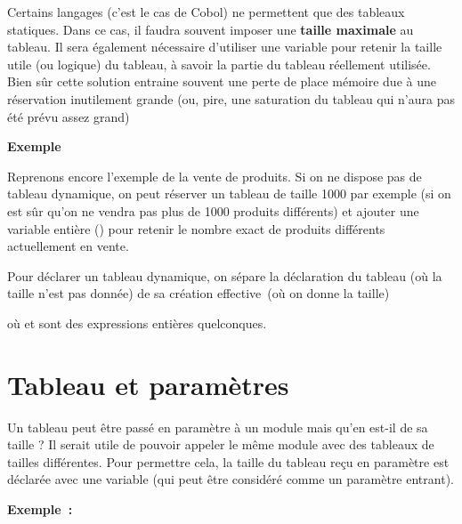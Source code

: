 	Certains langages (c’est le cas de Cobol) ne permettent 
	que des tableaux statiques. Dans ce cas, il faudra souvent
	imposer une \textbf{taille maximale} au tableau. 
	Il sera également nécessaire d’utiliser une variable 
	pour retenir la taille utile (ou logique) du tableau, 
	à savoir la partie du tableau réellement utilisée.
	Bien sûr cette solution entraine souvent une perte de place mémoire due
	à une réservation inutilement grande (ou, pire, une saturation du
	tableau qui n’aura pas été prévu assez grand)

	\textbf{Exemple}

	Reprenons encore l’exemple de la vente de produits. 
	Si on ne dispose pas de tableau dynamique, on peut réserver
	un tableau de taille 1000 par exemple (si on est sûr qu’on ne vendra
	pas plus de 1000 produits différents) et ajouter une variable entière
	() pour retenir 
	le nombre exact de produits différents actuellement en vente.

	Pour déclarer un tableau dynamique, on sépare la déclaration du tableau
	(où la taille n’est pas donnée) de sa création effective~(où on donne
	la taille)


	où  et  sont des
	expressions entières quelconques.

\section{Tableau et paramètres}

	Un tableau peut être passé en paramètre à un module mais qu’en est-il de
	sa taille ? Il serait utile de pouvoir appeler le même module avec des
	tableaux de tailles différentes. Pour permettre cela, la taille du
	tableau reçu en paramètre est déclarée avec une variable (qui peut être
	considéré comme un paramètre entrant).

	\textbf{Exemple~:}
	

